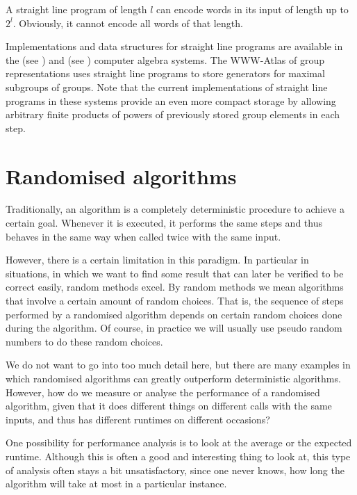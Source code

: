 \begin{Rem}
A straight line program of length $l$ can encode words in its input
of length up to $2^l$. Obviously, it cannot encode all words of that
length.
\end{Rem}

Implementations and data structures for straight line programs are
available in the {\GAP} (see \cite{GAP4}) and {\MAGMA} (see
\cite{Magma})
computer algebra systems. The
WWW-Atlas of group representations uses straight line programs to
store generators for maximal subgroups of groups. Note that the
current implementations of straight line programs in these systems
provide an even more compact storage by allowing arbitrary finite
products of powers of previously stored group elements in each step.


\section{Randomised algorithms}
\label{montevegas}

Traditionally, an algorithm is a completely deterministic procedure to
achieve a certain goal. Whenever it is executed, it performs the same
steps and thus behaves in the same way when called twice with the same input.

However, there is a certain limitation in this paradigm. In particular
in situations, in which we want to find some result that can later
be verified to be correct easily, random methods excel. By random
methods we mean algorithms that involve a certain amount of random
choices. That is, the sequence of steps performed by a randomised
algorithm depends on certain random choices done during the algorithm.
Of course, in practice we will usually use pseudo random numbers to
do these random choices.

We do not want to go into too much detail here, but there are many
examples in which randomised algorithms can greatly outperform
deterministic algorithms. However, how do we measure or analyse
the performance of a randomised algorithm, given that it does
different things on different calls with the same inputs, and thus
has different runtimes on different occasions?

One possibility for performance analysis is to look at the average
or the expected runtime. Although this is often a good and
interesting thing to look at, this type of analysis often stays a
bit unsatisfactory, since one never knows, how long the algorithm will
take at most in a particular instance.

